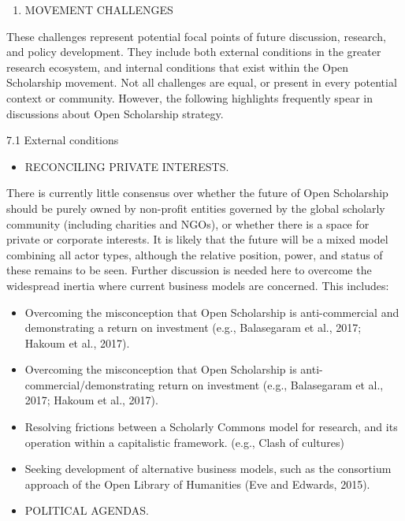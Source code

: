 \documentclass[]{article}
\providecommand{\tightlist}{%
  \setlength{\itemsep}{0pt}\setlength{\parskip}{0pt}}
\begin{document}
\begin{enumerate}
\def\labelenumi{\arabic{enumi}.}
\setcounter{enumi}{6}
\tightlist
\item
  MOVEMENT CHALLENGES
\end{enumerate}

These challenges represent potential focal points of future discussion,
research, and policy development. They include both external conditions
in the greater research ecosystem, and internal conditions that exist
within the Open Scholarship movement. Not all challenges are equal, or
present in every potential context or community. However, the following
highlights frequently spear in discussions about Open Scholarship
strategy.

7.1 External conditions

\begin{itemize}
\tightlist
\item
  RECONCILING PRIVATE INTERESTS.
\end{itemize}

There is currently little consensus over whether the future of Open
Scholarship should be purely owned by non-profit entities governed by
the global scholarly community (including charities and NGOs), or
whether there is a space for private or corporate interests. It is
likely that the future will be a mixed model combining all actor types,
although the relative position, power, and status of these remains to be
seen. Further discussion is needed here to overcome the widespread
inertia where current business models are concerned. This includes:

\begin{itemize}
\item
  Overcoming the misconception that Open Scholarship is anti-commercial
  and demonstrating a return on investment (e.g., Balasegaram et al.,
  2017; Hakoum et al., 2017).
\item
  Overcoming the misconception that Open Scholarship is
  anti-commercial/demonstrating return on investment (e.g., Balasegaram
  et al., 2017; Hakoum et al., 2017).
\item
  Resolving frictions between a Scholarly Commons model for research,
  and its operation within a capitalistic framework. (e.g., Clash of
  cultures)
\item
  Seeking development of alternative business models, such as the
  consortium approach of the Open Library of Humanities (Eve and
  Edwards, 2015).
\item
  POLITICAL AGENDAS.
\end{itemize}
\end{document}
